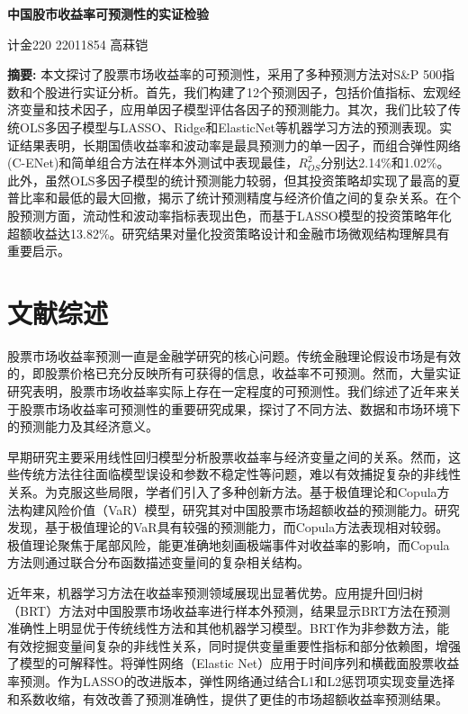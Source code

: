 \documentclass[12pt, a4paper]{article}
\begin{document}
\begin{center}
\LARGE\textbf{中国股市收益率可预测性的实证检验}

\vspace{1cm}
\large 计金220 22011854 高菻铠
\end{center}

\noindent \textbf{摘要:} 本文探讨了股票市场收益率的可预测性，采用了多种预测方法对S\&P 500指数和个股进行实证分析。首先，我们构建了12个预测因子，包括价值指标、宏观经济变量和技术因子，应用单因子模型评估各因子的预测能力。其次，我们比较了传统OLS多因子模型与LASSO、Ridge和ElasticNet等机器学习方法的预测表现。实证结果表明，长期国债收益率和波动率是最具预测力的单一因子，而组合弹性网络(C-ENet)和简单组合方法在样本外测试中表现最佳，$R^2_{OS}$分别达2.14\%和1.02\%。此外，虽然OLS多因子模型的统计预测能力较弱，但其投资策略却实现了最高的夏普比率和最低的最大回撤，揭示了统计预测精度与经济价值之间的复杂关系。在个股预测方面，流动性和波动率指标表现出色，而基于LASSO模型的投资策略年化超额收益达13.82\%。研究结果对量化投资策略设计和金融市场微观结构理解具有重要启示。

\section{文献综述}

股票市场收益率预测一直是金融学研究的核心问题。传统金融理论假设市场是有效的，即股票价格已充分反映所有可获得的信息，收益率不可预测。然而，大量实证研究表明，股票市场收益率实际上存在一定程度的可预测性。我们综述了近年来关于股票市场收益率可预测性的重要研究成果，探讨了不同方法、数据和市场环境下的预测能力及其经济意义。

早期研究主要采用线性回归模型分析股票收益率与经济变量之间的关系。然而，这些传统方法往往面临模型误设和参数不稳定性等问题，难以有效捕捉复杂的非线性关系。为克服这些局限，学者们引入了多种创新方法。\citet{chen2014}基于极值理论和Copula方法构建风险价值（VaR）模型，研究其对中国股票市场超额收益的预测能力。研究发现，基于极值理论的VaR具有较强的预测能力，而Copula方法表现相对较弱。极值理论聚焦于尾部风险，能更准确地刻画极端事件对收益率的影响，而Copula方法则通过联合分布函数描述变量间的复杂相关结构。

近年来，机器学习方法在收益率预测领域展现出显著优势。\citet{li2023}应用提升回归树（BRT）方法对中国股票市场收益率进行样本外预测，结果显示BRT方法在预测准确性上明显优于传统线性方法和其他机器学习模型。BRT作为非参数方法，能有效挖掘变量间复杂的非线性关系，同时提供变量重要性指标和部分依赖图，增强了模型的可解释性。\citet{rapach2020}将弹性网络（Elastic Net）应用于时间序列和横截面股票收益率预测。作为LASSO的改进版本，弹性网络通过结合L1和L2惩罚项实现变量选择和系数收缩，有效改善了预测准确性，提供了更佳的市场超额收益率预测结果。
\end{document}
